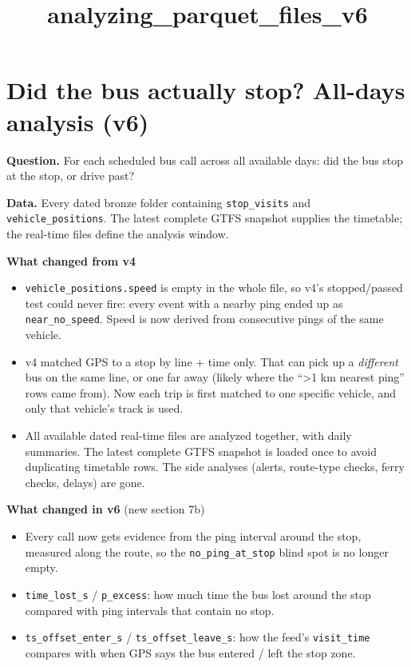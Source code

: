 \documentclass[11pt]{article}
\title{analyzing\_parquet\_files\_v6}
\providecommand{\tightlist}{%
      \setlength{\itemsep}{0pt}\setlength{\parskip}{0pt}}
\begin{document}
    
    \maketitle
    
    

    
    \section{Did the bus actually stop? All-days analysis
(v6)}\label{did-the-bus-actually-stop-all-days-analysis-v6}

\textbf{Question.} For each scheduled bus call across all available
days: did the bus stop at the stop, or drive past?

\textbf{Data.} Every dated bronze folder containing
\texttt{stop\_visits} and \texttt{vehicle\_positions}. The latest
complete GTFS snapshot supplies the timetable; the real-time files
define the analysis window.

\textbf{What changed from v4}

\begin{itemize}
\tightlist
\item
  \texttt{vehicle\_positions.speed} is empty in the whole file, so v4's
  stopped/passed test could never fire: every event with a nearby ping
  ended up as \texttt{near\_no\_speed}. Speed is now derived from
  consecutive pings of the same vehicle.
\item
  v4 matched GPS to a stop by line + time only. That can pick up a
  \emph{different} bus on the same line, or one far away (likely where
  the ``\textgreater1 km nearest ping'' rows came from). Now each trip
  is first matched to one specific vehicle, and only that vehicle's
  track is used.
\item
  All available dated real-time files are analyzed together, with daily
  summaries. The latest complete GTFS snapshot is loaded once to avoid
  duplicating timetable rows. The side analyses (alerts, route-type
  checks, ferry checks, delays) are gone.
\end{itemize}

\textbf{What changed in v6} (new section 7b)

\begin{itemize}
\tightlist
\item
  Every call now gets evidence from the ping interval around the stop,
  measured along the route, so the \texttt{no\_ping\_at\_stop} blind
  spot is no longer empty.
\item
  \texttt{time\_lost\_s} / \texttt{p\_excess}: how much time the bus
  lost around the stop compared with ping intervals that contain no
  stop.
\item
  \texttt{ts\_offset\_enter\_s} / \texttt{ts\_offset\_leave\_s}: how the
  feed's \texttt{visit\_time} compares with when GPS says the bus
  entered / left the stop zone.
\end{itemize}
\end{document}
